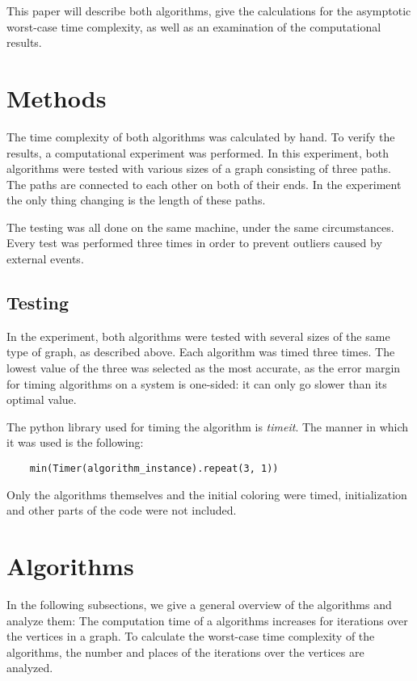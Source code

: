 \documentclass[twoside]{article}
\begin{document}
\begin{multicols}{2}
This paper will describe both algorithms, give the calculations for the asymptotic worst-case time complexity, as well as an examination of the computational results.
\section{Methods}
\label{methods}
The time complexity of both algorithms was calculated by hand. To verify the results, a computational experiment was performed. In this experiment, both algorithms were tested with various sizes of a graph consisting of three paths. The paths are connected to each other on both of their ends. In the experiment the only thing changing is the length of these paths.

The testing was all done on the same machine, under the same circumstances. Every test was performed three times in order to prevent outliers caused by external events.

\subsection{Testing}
\label{methods:testing}
In the experiment, both algorithms were tested with several sizes of the same type of graph, as described above. Each algorithm was timed three times. The lowest value of the three was selected as the most accurate, as the error margin for timing algorithms on a system is one-sided: it can only go slower than its optimal value.

The python library used for timing the algorithm is \emph{timeit}. The manner in which it was used is the following:
\begin{lstlisting}
	min(Timer(algorithm_instance).repeat(3, 1))
\end{lstlisting}

Only the algorithms themselves and the initial coloring were timed, initialization and other parts of the code were not included.

\section{Algorithms}
\label{algs}
In the following subsections, we give a general overview of the algorithms and analyze them:
The computation time of a algorithms increases for iterations over the vertices in a graph. To calculate the worst-case time complexity of the algorithms, the number and places of the iterations over the vertices are analyzed.


\end{multicols}
\end{document}
